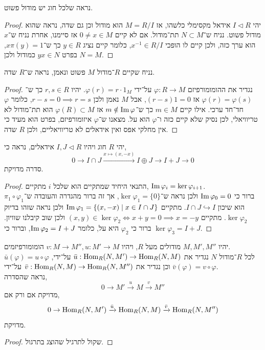 \subquestion{}
נראה שלכל חוג יש מודול פשוט.
\begin{proof}
	יהי $I \triangleleft R$ אידאל מקסימלי כלשהו, אז $M = R / I$ הוא מודול וכן גם שדה, נראה שהוא מודול פשוט.
	נניח ש־$N \subset M$ תת־מודול. אם לא קיים $0 \ne x \in M$ אז סיימנו, אחרת נניח ש־$x$ הוא ערך כזה, ולכן קיים לו הופכי $x^{-1} \in R / I$,
	כלומר קיים נציג $y \in R$ כך ש־$x \pi(y) = 1$, בפרט $y x \in N$ כמודול ולכן $N = M$.
\end{proof}

\subquestion{}
נניח שקיים $R$־מודול $M$ פשוט ונאמן, נראה ש־$R$ שדה.
\begin{proof}
	נגדיר את ההומומורפיזם $\varphi : R \to M$ על־ידי $\varphi(r) = r \cdot 1_M$.
	יהיו $r, s \in R$ כך ש־$\varphi(r) = \varphi(s)$ אז $(r - s) 1 = 0$, אבל $M$ נאמן ולכן $r - s = 0 \implies r = s$, כלומר $\varphi$ חד־חד ערכי.
	אילו קיים $m \in M$ כך ש־$m \notin \operatorname{Im} \varphi$ אז $\varphi(R) \subset M$ הוא תת־מודול לא טריוויאלי, לכן נסיק שלא קיים כזה ו־$\varphi$ הוא על.
	מצאנו ש־$\varphi$ איזומורפיזם, בפרט הוא מעיד כי אין מחלקי אפס ואין אידאלים לא טריוויאליים, ולכן $R$ שדה.
\end{proof}

\question{}
יהי $R$ חוג ויהיו $I, J \triangleleft R$ אידאלים,
נראה כי,
\[
	0
	\to I \cap J
	\xrightarrow{x \mapsto (x, -x)} I \oplus J
	\to I + J
	\to 0
\]
סדרה מדויקת.
\begin{proof}
	התנאי היחיד שמתקיים הוא שלכל $i$ מתקיים, $\operatorname{Im} \varphi_i = \ker \varphi_{i + 1}$. \\
	ברור כי $\operatorname{Im} \varphi_0 = 0$ ולכן נראה ש־$\ker \varphi_1 = \{ 0 \}$, אך זה ברור מהגדרה והעובדה ש־$\pi_1 \circ \varphi_1$ הוא שיכון $I \cap J \hookrightarrow I$.
	מתקיים $\operatorname{Im} \varphi_1 = \{ (x, -x) \mid x \in I \cap J \}$ ולכן נראה שזהו בדיוק $\ker \varphi_2$.
	מתקיים $(x, y) \in \ker \varphi_2 \iff x + y = 0 \implies x = -y$ ולכן שוב קיבלנו שוויון.
	ברור כי $\varphi_2$ היא על, כלומר $\operatorname{Im} \varphi_2 = I + J$, וברור כי $\ker \varphi_3 = I + J$.
\end{proof}

\question{}
יהיו $M, M', M''$ מודולים מעל $R$, ויהיו $v : M \to M'', u : M' \to M$ הומומורפיזמים. \\
לכל $R$־מודול $N$ נגדיר את $\bar{u} : \operatorname{Hom}_R(N, M') \to \operatorname{Hom}_R(N, M)$ על־ידי, $\bar{u}(\varphi) = u \circ \varphi$ וכן נגדיר את $\bar{v} : \operatorname{Hom}_R(N, M) \to \operatorname{Hom}_R(N, M'')$ על־ידי $\bar{v}(\varphi) = v \circ \varphi$. \\
נראה שהסדרה,
\[
	0
	\to M'
	\xrightarrow{u} M
	\xrightarrow{v} M''
\]
מדויקת אם ורק אם,
\[
	0
	\to \operatorname{Hom}_R(N, M')
	\xrightarrow{\bar{u}} \operatorname{Hom}_R(N, M)
	\xrightarrow{\bar{v}} \operatorname{Hom}_R(N, M'')
\]
מדויקת.
\begin{proof}
	שקול לתרגיל שהוצג בתרגול.
\end{proof}

